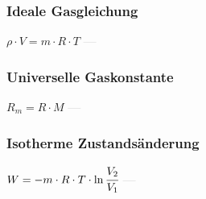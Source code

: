 \subsubsection{Ideale Gasgleichung} 
\begin{minipage}{0.45\textwidth} 
\end{minipage} 
\begin{minipage}{0.45\textwidth} 
 
\end{minipage} 
$\rho \cdot V = m \cdot R \cdot T$ \textcolor{lightgray}{\textbf{---}} 

\subsubsection{Universelle Gaskonstante} 
\begin{minipage}{0.45\textwidth} 
\end{minipage} 
\begin{minipage}{0.45\textwidth} 
 
\end{minipage} 
$ R_{m} = R \cdot M $ \textcolor{lightgray}{\textbf{---}} 

\subsubsection{Isotherme Zustandsänderung} 
\begin{minipage}{0.45\textwidth} 
\end{minipage} 
\begin{minipage}{0.45\textwidth} 
 
\end{minipage} 
$ W = -m \cdot R \cdot T \cdot \ln{\cfrac{V_2}{V_1}} $ \textcolor{lightgray}{\textbf{---}} 

